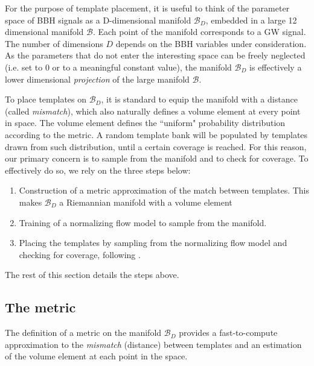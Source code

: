 \documentclass[twocolumn,showpacs,preprintnumbers,nofootinbib,prd,
superscriptaddress,10pt]{revtex4-2}
\begin{document}
For the purpose of template placement, it is useful to think of the parameter space of BBH signals as a D-dimensional manifold $\mathcal{B}_D$, embedded in a large 12 dimensional manifold $\mathcal{B}$. Each point of the manifold corresponds to a GW signal. The number of dimensions $D$ depends on the BBH variables under consideration.
As the parameters that do not enter the interesting space can be freely neglected (i.e. set to $0$ or to a meaningful constant value), the manifold $\mathcal{B}_D$ is effectively a lower dimensional {\it projection} of the large manifold $\mathcal{B}$.

To place templates on $\mathcal{B}_D$, it is standard to equip the manifold with a distance (called {\it mismatch}), which also naturally defines a volume element at every point in space. The volume element defines the ``uniform" probability distribution according to the metric.
A random template bank will be populated by templates drawn from such distribution, until a certain coverage is reached. For this reason, our primary concern is to sample from the manifold and to check for coverage. To effectively do so, we rely on the three steps below:
\begin{enumerate}
	\item Construction of a metric approximation of the match between templates. This makes $\mathcal{B}_D$ a Riemannian manifold with a volume element
	\item Training of a normalizing flow model to sample from the manifold. 
	\item Placing the templates by sampling from the normalizing flow model and checking for coverage, following \cite{Coogan:2022qxs}.
\end{enumerate}
The rest of this section details the steps above.

\subsection{The metric} \label{sec:metric}

The definition of a metric on the manifold $\mathcal{B}_D$ provides a fast-to-compute approximation to the {\it mismatch} (distance) between templates and an estimation of the volume element at each point in the space.
\end{document}
